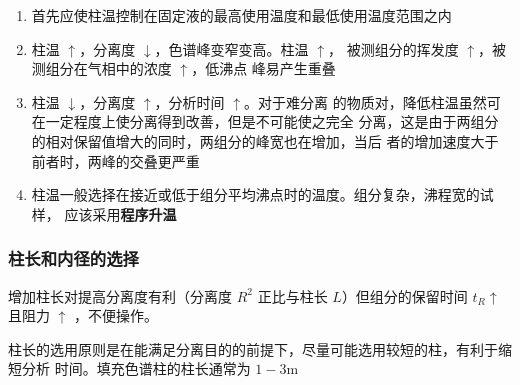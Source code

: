 \begin{enumerate}
    \item 首先应使柱温控制在固定液的最高使用温度和最低使用温度范围之内
    \item 柱温 $\uparrow$，分离度 $\downarrow$，色谱峰变窄变高。柱温 $\uparrow$，
          被测组分的挥发度 $\uparrow$，被测组分在气相中的浓度 $\uparrow$，低沸点
          峰易产生重叠
    \item 柱温 $\downarrow$，分离度 $\uparrow$，分析时间 $\uparrow$。对于难分离
          的物质对，降低柱温虽然可在一定程度上使分离得到改善，但是不可能使之完全
          分离，这是由于两组分的相对保留值增大的同时，两组分的峰宽也在增加，当后
          者的增加速度大于前者时，两峰的交叠更严重
    \item 柱温一般选择在接近或低于组分平均沸点时的温度。组分复杂，沸程宽的试样，
          应该采用\textbf{程序升温}
\end{enumerate}

\subsubsection{柱长和内径的选择}

增加柱长对提高分离度有利（分离度 $R^2$ 正比与柱长 $L$）但组分的保留时间 $t_R
    \uparrow$ 且阻力 $\uparrow$ ，不便操作。

柱长的选用原则是在能满足分离目的的前提下，尽量可能选用较短的柱，有利于缩短分析
时间。填充色谱柱的柱长通常为 $1 - 3 \mathrm{m}$
